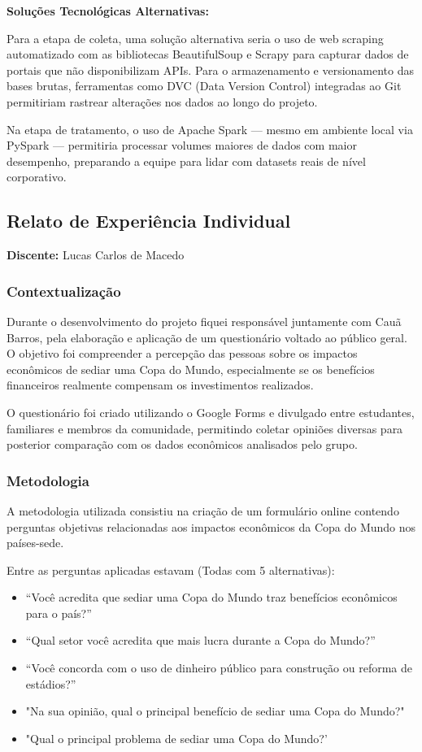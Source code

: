 \documentclass[12pt, a4paper, brazil]{article}
\begin{document}
\vspace{0.4cm}
\textbf{Soluções Tecnológicas Alternativas:}

Para a etapa de coleta, uma solução alternativa seria o uso de web scraping automatizado com as bibliotecas BeautifulSoup e Scrapy para capturar dados de portais que não disponibilizam APIs. Para o armazenamento e versionamento das bases brutas, ferramentas como DVC (Data Version Control) integradas ao Git permitiriam rastrear alterações nos dados ao longo do projeto.

Na etapa de tratamento, o uso de Apache Spark — mesmo em ambiente local via PySpark — permitiria processar volumes maiores de dados com maior desempenho, preparando a equipe para lidar com datasets reais de nível corporativo.


\subsection{Relato de Experiência Individual}
\textbf{Discente:} Lucas Carlos de Macedo

\subsubsection{Contextualização}
Durante o desenvolvimento do projeto fiquei responsável juntamente com Cauã Barros, pela elaboração e aplicação de um questionário voltado ao público geral. O objetivo foi compreender a percepção das pessoas sobre os impactos econômicos de sediar uma Copa do Mundo, especialmente se os benefícios financeiros realmente compensam os investimentos realizados. 

O questionário foi criado utilizando o Google Forms e divulgado entre estudantes, familiares e membros da comunidade, permitindo coletar opiniões diversas para posterior comparação com os dados econômicos analisados pelo grupo.

\subsubsection{Metodologia}
A metodologia utilizada consistiu na criação de um formulário online contendo perguntas objetivas relacionadas aos impactos econômicos da Copa do Mundo nos países-sede.

Entre as perguntas aplicadas estavam (Todas com 5 alternativas): 

\begin{itemize}
    \item “Você acredita que sediar uma Copa do Mundo traz benefícios econômicos para o país?”
    \item “Qual setor você acredita que mais lucra durante a Copa do Mundo?”
    \item “Você concorda com o uso de dinheiro público para construção ou reforma de estádios?” 
    \item "Na sua opinião, qual o principal benefício de sediar uma Copa do Mundo?"
    \item "Qual o principal problema de sediar uma Copa do Mundo?' 
\end{itemize}
 
\end{document}
